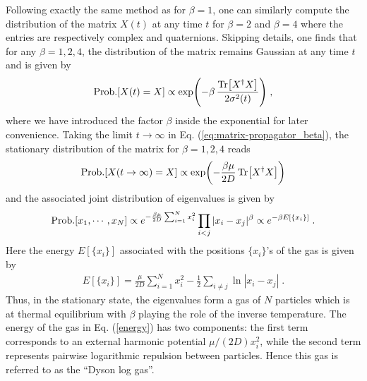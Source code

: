 \documentclass[onecolumn,superscriptaddress,
 amsmath,amssymb,
 aps,
 prd,
]{revtex4-1}
\newcommand{\bea}{\begin{eqnarray}}
\newcommand{\eea}{\end{eqnarray}}
\begin{document}
\vspace*{0.3cm}
Following exactly the same method as for $\beta = 1$, one can similarly compute the distribution of the matrix $X(t)$ at any time $t$ for $\beta= 2$ and $\beta = 4$ where the entries are respectively complex and quaternions. Skipping details, one finds that for any $\beta=  1, 2, 4$, the distribution of the matrix remains Gaussian at any time $t$ and is given by
\begin{equation} \label{eq:matrix-propagator_beta}
{\rm Prob.}[X(t) = X] \propto \exp( - \beta \, \frac{\Tr[X^\dagger X]}{2 \sigma^2(t)} ) \;,
\end{equation}
where we have introduced the factor $\beta$ inside the exponential for later convenience. Taking the limit $t \to \infty$ in Eq. (\ref{eq:matrix-propagator_beta}), the stationary distribution of the matrix for $\beta = 1, 2, 4$ reads
\bea
{\rm Prob.}[X(t \to \infty) = X] \propto \exp( - \frac{\beta \mu}{2D} \Tr[X^\dagger X]  ) 
\eea
and the associated joint distribution of eigenvalues is given by \cite{F10}
\bea \label{P_joint_Xeq_Gbeta}
{\rm Prob.} [x_1, \cdots, x_N] \propto e^{- \frac{\beta \mu}{2D} \sum_{i=1}^N x_i^2} \prod_{i<j} |x_i - x_j|^\beta \propto e^{-\beta E[\{ x_i\}]} \;.
\eea
Here the energy $E[\{ x_i\}]$ associated with 
the positions $\{x_i\}$'s of the gas is given by
\bea \label{energy}
E[\{ x_i\}] = \frac{\mu}{2D} \sum_{i=1}^N x_i^2 - \frac{1}{2} \sum_{i \neq j} \ln |x_i-x_j| \;.
\eea
Thus, in the stationary state, the eigenvalues form a gas of $N$ particles which is at thermal equilibrium with $\beta$ playing the role of the
inverse temperature. The energy of the gas in Eq. (\ref{energy}) has two components: the first term corresponds to an external harmonic
potential $\mu/(2 D) x_i^2$, while the second term represents pairwise logarithmic repulsion between particles. Hence this gas is referred to
as the ``Dyson log gas''. 
\end{document}
